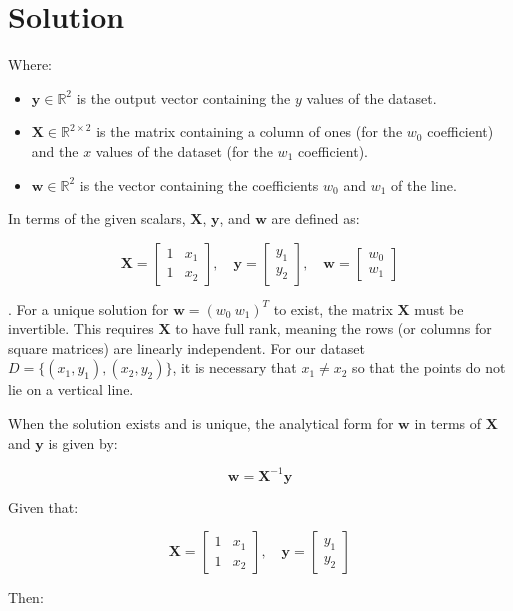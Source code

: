 \documentclass{harvardml}
\theoremstyle{definition}
\theoremstyle{plain}
\newenvironment{solution}
  {\color{blue}\section*{Solution}}
{}
\begin{document}
\begin{solution}
Where:
\begin{itemize}
  \item $\mathbf{y} \in \mathbb{R}^2$ is the output vector containing the $y$ values of the dataset.
  \item $\mathbf{X} \in \mathbb{R}^{2 \times 2}$ is the matrix containing a column of ones (for the $w_0$ coefficient) and the $x$ values of the dataset (for the $w_1$ coefficient).
  \item $\mathbf{w} \in \mathbb{R}^2$ is the vector containing the coefficients $w_0$ and $w_1$ of the line.
\end{itemize}

In terms of the given scalars, $\mathbf{X}$, $\mathbf{y}$, and $\mathbf{w}$ are defined as:

\[
\mathbf{X} = \begin{bmatrix} 1 & x_1 \\ 1 & x_2 \end{bmatrix}, \quad
\mathbf{y} = \begin{bmatrix} y_1 \\ y_2 \end{bmatrix}, \quad
\mathbf{w} = \begin{bmatrix} w_0 \\ w_1 \end{bmatrix}
\]

. For a unique solution for $\mathbf{w} = (w_0 \ w_1)^T$ to exist, the matrix $\mathbf{X}$ must be invertible. This requires $\mathbf{X}$ to have full rank, meaning the rows (or columns for square matrices) are linearly independent. For our dataset $D = \{(x_1, y_1), (x_2, y_2)\}$, it is necessary that $x_1 \neq x_2$ so that the points do not lie on a vertical line.

When the solution exists and is unique, the analytical form for $\mathbf{w}$ in terms of $\mathbf{X}$ and $\mathbf{y}$ is given by:

\[
\mathbf{w} = \mathbf{X}^{-1}\mathbf{y}
\]

Given that:

\[
\mathbf{X} = \begin{bmatrix} 1 & x_1 \\ 1 & x_2 \end{bmatrix}, \quad
\mathbf{y} = \begin{bmatrix} y_1 \\ y_2 \end{bmatrix}
\]

Then:


\end{solution}
\end{document}

